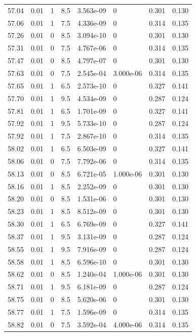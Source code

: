 \documentclass[preview]{standalone}
\begin{document}
{{{{{{{{{{{{{{{{{\begin{tabular}{L{1.2cm}C{1.2cm} C{0.3cm}C{0.5cm} C{1.4cm}C{1.4cm} C{1.4cm}C{1.4cm}}
  57.04  &  0.01  & 1     & 8.5 &  3.563e-09  & 0  & 0.301 &  0.130   \\ 
  57.06  &  0.01  & 1     & 7.5 &  4.336e-09  & 0  & 0.314 &  0.135   \\ 
  57.26  &  0.01  & 0     & 8.5 &  3.094e-10  & 0  & 0.301 &  0.130   \\ 
  57.31  &  0.01  & 0     & 7.5 &  4.767e-06  & 0  & 0.314 &  0.135   \\ 
  57.47  &  0.01  & 0     & 8.5 &  4.797e-07  & 0  & 0.301 &  0.130   \\ 
  57.63  &  0.01  & 0     & 7.5 &  2.545e-04  & 3.000e-06  & 0.314 &  0.135   \\ 
  57.65  &  0.01  & 1     & 6.5 &  2.573e-10  & 0  & 0.327 &  0.141   \\ 
  57.70  &  0.01  & 1     & 9.5 &  4.534e-09  & 0  & 0.287 &  0.124   \\ 
  57.81  &  0.01  & 1     & 6.5 &  1.701e-09  & 0  & 0.327 &  0.141   \\ 
  57.92  &  0.01  & 1     & 9.5 &  5.733e-10  & 0  & 0.287 &  0.124   \\ 
  57.92  &  0.01  & 1     & 7.5 &  2.867e-10  & 0  & 0.314 &  0.135   \\ 
  58.02  &  0.01  & 1     & 6.5 &  6.503e-09  & 0  & 0.327 &  0.141   \\ 
  58.06  &  0.01  & 0     & 7.5 &  7.792e-06  & 0  & 0.314 &  0.135   \\ 
  58.13  &  0.01  & 0     & 8.5 &  6.721e-05  & 1.000e-06  & 0.301 &  0.130   \\ 
  58.16  &  0.01  & 1     & 8.5 &  2.252e-09  & 0  & 0.301 &  0.130   \\ 
  58.20  &  0.01  & 0     & 8.5 &  1.531e-06  & 0  & 0.301 &  0.130   \\ 
  58.23  &  0.01  & 1     & 8.5 &  8.512e-09  & 0  & 0.301 &  0.130   \\ 
  58.30  &  0.01  & 1     & 6.5 &  6.769e-09  & 0  & 0.327 &  0.141   \\ 
  58.37  &  0.01  & 1     & 9.5 &  3.131e-09  & 0  & 0.287 &  0.124   \\ 
  58.55  &  0.01  & 1     & 9.5 &  7.916e-09  & 0  & 0.287 &  0.124   \\ 
  58.58  &  0.01  & 1     & 8.5 &  6.596e-10  & 0  & 0.301 &  0.130   \\ 
  58.62  &  0.01  & 0     & 8.5 &  1.240e-04  & 1.000e-06  & 0.301 &  0.130   \\ 
  58.71  &  0.01  & 1     & 9.5 &  6.181e-09  & 0  & 0.287 &  0.124   \\ 
  58.75  &  0.01  & 0     & 8.5 &  5.620e-06  & 0  & 0.301 &  0.130   \\ 
  58.77  &  0.01  & 1     & 7.5 &  1.596e-09  & 0  & 0.314 &  0.135   \\ 
  58.82  &  0.01  & 0     & 7.5 &  3.592e-04  & 4.000e-06  & 0.314 &  0.135   \\ 
\hline 
\end{tabular} 

}}}}}}}}}}}}}}}}}
\end{document}
